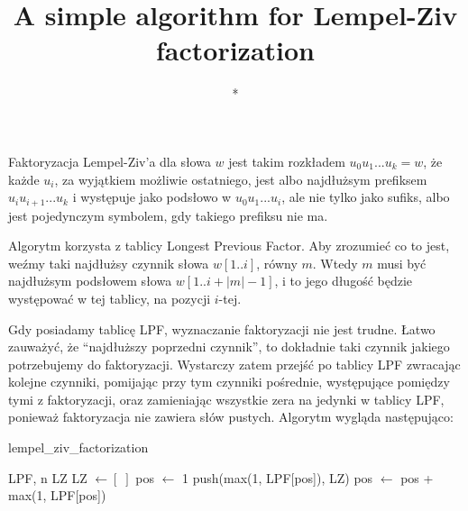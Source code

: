\documentclass[a4paper,12pt]{article}
\title{A simple algorithm for Lempel-Ziv factorization}
\author{*}
\begin{document}
\maketitle

Faktoryzacja Lempel-Ziv'a dla słowa $w$ jest takim rozkładem $u_0 u_1 ... u_k = w$,
że każde $u_i$, za wyjątkiem możliwie ostatniego,
jest albo najdłużsym prefiksem $u_i u_{i + 1} ... u_k$ i występuje jako podsłowo w $u_0 u_1 ... u_i$,
ale nie tylko jako sufiks,
albo jest pojedynczym symbolem, gdy takiego prefiksu nie ma.

Algorytm korzysta z tablicy Longest Previous Factor.
Aby zrozumieć co to jest, weźmy taki najdłużsy czynnik słowa $w[1..i]$, równy $m$.
Wtedy $m$ musi być najdłużsym podsłowem słowa $w[1..i + |m| - 1]$,
i to jego długość będzie występować w tej tablicy, na pozycji $i$-tej.

Gdy posiadamy tablicę LPF, wyznaczanie faktoryzacji nie jest trudne.
Łatwo zauważyć, że ``najdłuższy poprzedni czynnik'', to dokładnie taki czynnik jakiego potrzebujemy do faktoryzacji.
Wystarczy zatem przejść po tablicy LPF zwracając kolejne czynniki,
pomijając przy tym czynniki pośrednie, występujące pomiędzy tymi z faktoryzacji,
oraz zamieniając wszystkie zera na jedynki w tablicy LPF, ponieważ faktoryzacja nie zawiera słów pustych.
Algorytm wygląda następująco:

\begin{algorithm}
\caption{lempel\_ziv\_factorization}
\begin{algorithmic} 
\REQUIRE LPF, n
\ENSURE LZ
\STATE LZ $\gets [\;]$
\STATE pos $\gets$ 1
\STATE push(max(1, LPF[pos]), LZ)
\STATE pos $\gets$ pos + max(1, LPF[pos])
\ENDWHILE
\end{algorithmic}
\end{algorithm}
\end{document}
